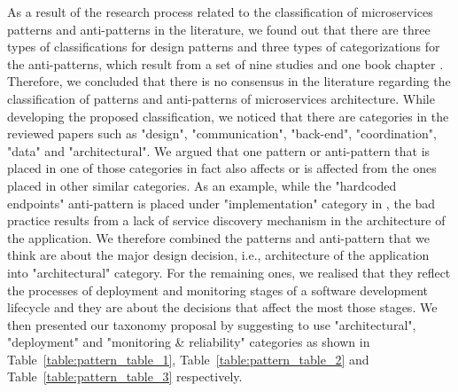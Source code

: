 \documentclass[11pt,a4paper,twocolumn]{article}
\begin{document}
As a result of the research process related to the classification of microservices patterns and anti-patterns in the literature, we found out that there are three types of classifications for design patterns and three types of categorizations for the anti-patterns, which result from a set of nine studies and one book chapter \cite{TaibiD2018APfM}\cite{KARABEYAKSAKALLI2021111014}\cite{valdivia}\cite{10.1145/3241403.3241429}\cite{8719492}\cite{9105640}\cite{Taibi2020}\cite{10.1145/3424771.3424812}\cite{8712355}\cite{9522227}. 
Therefore, we concluded that there is no consensus in the literature regarding the classification of patterns and anti-patterns of microservices architecture.
While developing the proposed classification, we noticed that there are categories in the reviewed papers such as "design", "communication", "back-end", "coordination", "data" and "architectural". We argued that one pattern or anti-pattern that is placed in one of those categories in fact also affects or is affected from the ones placed in other similar categories.
As an example, while the "hardcoded endpoints" anti-pattern is placed under "implementation" category in \cite{10.1145/3424771.3424812}, the bad practice results from a lack of service discovery mechanism in the architecture of the application.
We therefore combined the patterns and anti-pattern that we think are about the major design decision, i.e., architecture of the application into "architectural" category.
For the remaining ones, we realised that they reflect the processes of deployment and monitoring stages of a software development lifecycle and they are about the decisions that affect the most those stages.
We then presented our taxonomy proposal by suggesting to use "architectural", "deployment" and "monitoring \& reliability" categories as shown in Table~\ref{table:pattern_table_1}, Table~\ref{table:pattern_table_2} and Table~\ref{table:pattern_table_3} respectively.
\end{document}
